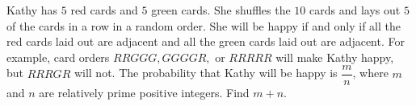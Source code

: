 Kathy has \(5\) red cards and \(5\) green cards. She shuffles the \(10\) cards and lays out \(5\) of the cards in a row in a random order. She will be happy if and only if all the red cards laid out are adjacent and all the green cards laid out are adjacent. For example, card orders \(RRGGG, GGGGR,\) or \(RRRRR\) will make Kathy happy, but \(RRRGR\) will not. The probability that Kathy will be happy is \( \dfrac{m}{n}\), where \(m\) and \(n\) are relatively prime positive integers. Find \(m + n\).